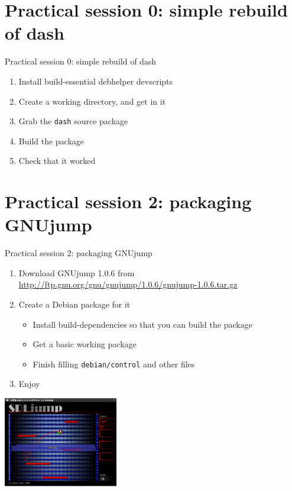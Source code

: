 \documentclass[10pt,final]{beamer}
\begin{document}
\section{Practical session 0: simple rebuild of dash}
\begin{frame}{Practical session 0: simple rebuild of dash}
  \begin{enumerate}
	\item Install build-essential debhelper devscripts
  \item Create a working directory, and get in it
  \item Grab the \texttt{dash} source package
  \item Build the package
  \item Check that it worked
  \end{enumerate}
\end{frame}

\section{Practical session 2: packaging GNUjump}
\begin{frame}{Practical session 2: packaging GNUjump}
\begin{enumerate}
	\item Download GNUjump 1.0.6 from
		\url{http://ftp.gnu.org/gnu/gnujump/1.0.6/gnujump-1.0.6.tar.gz}
		\br
	\item Create a Debian package for it
		\begin{itemize}
			\item Install build-dependencies so that you can build the package
			\item Get a basic working package
			\item Finish filling \texttt{debian/control} and other files
		\end{itemize}
		\br
	\item Enjoy
\end{enumerate}
\centerline{\includegraphics[width=5cm]{figs/gnujump.png}}
\end{frame}
\end{document}
